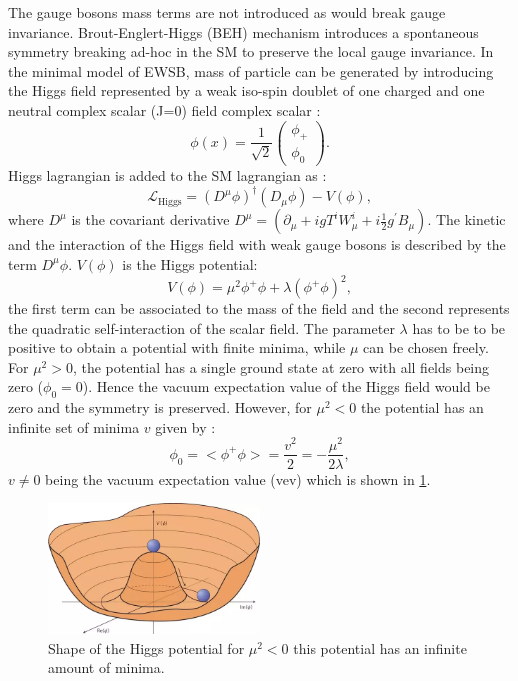 The gauge bosons mass terms are not introduced as would break gauge invariance. Brout-Englert-Higgs (BEH) mechanism introduces a spontaneous symmetry breaking ad-hoc in the SM to preserve the local gauge invariance. In the minimal model of EWSB, mass of particle can be generated by introducing the Higgs field represented by a weak iso-spin doublet of one charged and one neutral complex scalar (J=0) field complex scalar :
\begin{equation}
    \phi(x)=\frac{1}{\sqrt{2}}\left(\begin{array}{c}
\phi_{+} \\
\phi_{0}
\end{array}\right).
\end{equation}
Higgs lagrangian is added to the SM lagrangian as :
\begin{equation}
    \mathcal{L}_{\mathrm{Higgs}}=\left(D^{\mu} \phi\right)^{\dagger}\left(D_{\mu} \phi\right)-V(\phi),
\end{equation}
where $D^\mu$ is the covariant derivative $D^\mu =\left(\partial_{\mu}+i g T^{i} W_{\mu}^{i}+i \frac{1}{2} g^{\prime} B_{\mu}\right)$. The kinetic and the interaction of the Higgs field with weak gauge bosons is described by the term $D^\mu\phi$. $V(\phi)$ is the Higgs potential:
\begin{equation}
    V(\phi)=\mu^{2} \phi^{+} \phi+\lambda\left(\phi^{+} \phi\right)^{2},
\end{equation}
the first term can be associated to the mass of the field and the second represents the quadratic self-interaction of the scalar field. The parameter $\lambda$ has to be to be positive to obtain a potential with finite minima, while $\mu$ can be chosen freely. For $\mu^{2} > 0$, the potential has a single ground state at zero with all fields being zero ($\phi_0 = 0$). Hence the vacuum expectation value of the Higgs field would be zero and the symmetry is preserved. However, for $\mu^{2} < 0$ the potential has an infinite set of minima $v$ given by :
\begin{equation}
    \phi_{0}=<\phi^{+} \phi>=\frac{v^{2}}{2}=-\frac{\mu^{2}}{2 \lambda},
\end{equation}
$v\neq0$ being the vacuum expectation value (vev) which is shown in \ref{fig:chap1:Higggs_potential}.
\begin{figure}[ht]
    \centering
    \includegraphics[width=0.5\textwidth]{Ch1/Img/Higgs_potential.png}
    \caption{Shape of the Higgs potential for $\mu^{2} < 0$ this potential has an infinite amount of minima.}
    \label{fig:chap1:Higggs_potential}
\end{figure}
